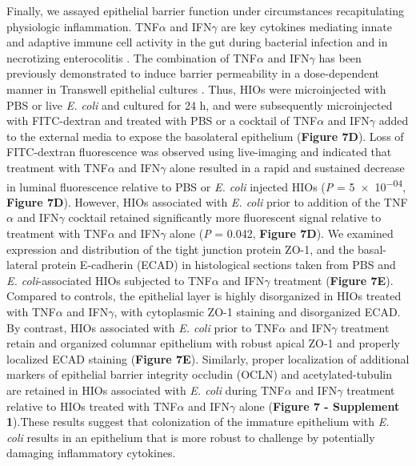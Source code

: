 \documentclass[9pt,lineo]{elife}
\begin{document}
Finally, we assayed epithelial barrier function under circumstances recapitulating physiologic inflammation. TNF\(\alpha\) and IFN\(\gamma\) are key cytokines mediating innate and adaptive immune cell activity in the gut \citep{Turner:2009} during bacterial infection \citep{Rhee:2005,Emami:2012} and in necrotizing enterocolitis \citep{Tan:1993,Ford:1996,Ford:1997,Halpern:2003,Upperman:2005}. The combination of TNF\(\alpha\) and IFN\(\gamma\) has been previously demonstrated to induce barrier permeability in a dose-dependent manner in Transwell epithelial cultures \citep{Wang:2005,Wang:2006}. Thus, HIOs were microinjected with PBS or live \emph{E. coli} and cultured for 24 h, and were subsequently microinjected with FITC-dextran and treated with PBS or a cocktail of TNF\(\alpha\) and IFN\(\gamma\) added to the external media to expose the basolateral epithelium (\textbf{Figure 7D}). Loss of FITC-dextran fluorescence was observed using live-imaging and indicated that treatment with TNF\(\alpha\) and IFN\(\gamma\) alone resulted in a rapid and sustained decrease in luminal fluorescence relative to  PBS or \emph{E. coli} injected HIOs (\emph{P} = \num{5e-04}, \textbf{Figure 7D}). However, HIOs associated with \emph{E. coli} prior to addition of the TNF\(\alpha\) and IFN\(\gamma\) cocktail retained significantly more fluorescent signal relative to treatment with TNF\(\alpha\) and IFN\(\gamma\) alone (\emph{P} = 0.042, \textbf{Figure 7D}). We examined expression and distribution of the tight junction protein ZO-1, and the basal-lateral protein E-cadherin (ECAD)  in histological sections taken from PBS and \emph{E. coli}-associated HIOs subjected to TNF\(\alpha\) and IFN\(\gamma\) treatment (\textbf{Figure 7E}). Compared to controls, the epithelial layer is highly disorganized in HIOs treated with TNF\(\alpha\) and IFN\(\gamma\), with cytoplasmic ZO-1 staining and disorganized ECAD. By contrast, HIOs associated with \emph{E. coli} prior to TNF\(\alpha\) and IFN\(\gamma\) treatment retain and organized columnar epithelium with robust apical ZO-1 and properly localized ECAD staining (\textbf{Figure 7E}). Similarly, proper localization of additional markers of epithelial barrier integrity occludin (OCLN) and acetylated-tubulin are retained in HIOs associated with \emph{E. coli} during TNF\(\alpha\) and IFN\(\gamma\) treatment relative to HIOs treated with TNF\(\alpha\) and IFN\(\gamma\) alone (\textbf{Figure 7 - Supplement 1}).These results suggest that colonization of the immature epithelium with \emph{E. coli} results in an epithelium that is more robust to challenge by potentially damaging inflammatory cytokines.
\end{document}
